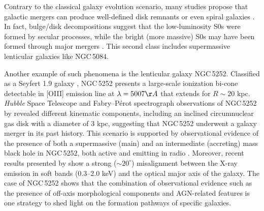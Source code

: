 \documentclass[modern]{CORE-AAS/aastex631}
\begin{document}
Contrary to the classical galaxy evolution scenario, many studies propose that galactic mergers can produce well-defined disk remnants \citep{hopkins+2013mnras430_1901,elichemoral+2018aap617_113} or even spiral galaxies \citep{athanassoula+2016apj821_90,peschken+2017mnras468_994}. In fact, bulge/disk decompositions suggest that the low-luminosity S0s were formed by secular processes, while the bright (more massive) S0s may have been formed through major mergers \citep{barway+2009mnras394_1991,frasermckelvie+2018mnras481_5580}. This second class includes supermassive lenticular galaxies like NGC\,5084.\par 
{}
Another example of such phenomena is the lenticular galaxy NGC\,5252. Classified as a Seyfert 1.9 galaxy \citep{argyle+1990mnras243_504, osterbrock+1993apj414_552}, NGC\,5252 presents a large-scale ionization bi-cone \citep{tadhunter+1989nat341_422} detectable in [OIII] emission line at $\lambda=5007\AA$ that extends for $R\sim20$ kpc. \emph{Hubble} Space Telescope and Fabry--P\'{e}rot spectrograph observations of NGC\,5252 by \citet{morse+1998apj505_159} revealed different kinematic components, including an inclined circumnuclear gas disk with a diameter of 3 kpc, suggesting that NGC\,5252 underwent a galaxy merger in its past history. This scenario is supported by observational evidence of the presence of both a supermassive (main) and an intermediate (accreting) mass black hole in NGC\,5252, both active and emitting in radio \citep{kim+2015apj814_8, kim+2017apj844_21, yang+2017mnras464_70}. Moreover, recent results presented by \citet{wang+2024arXiv2401.09172} show a strong ($\sim20^{\circ}$) misalignment between the X-ray emission in soft bands (0.3--2.0 keV) and the optical major axis of the galaxy. The case of NGC\,5252 shows that the combination of observational evidence such as the presence of off-axis morphological components and AGN-related features is one strategy to shed light on the formation pathways of specific galaxies. 
\end{document}
